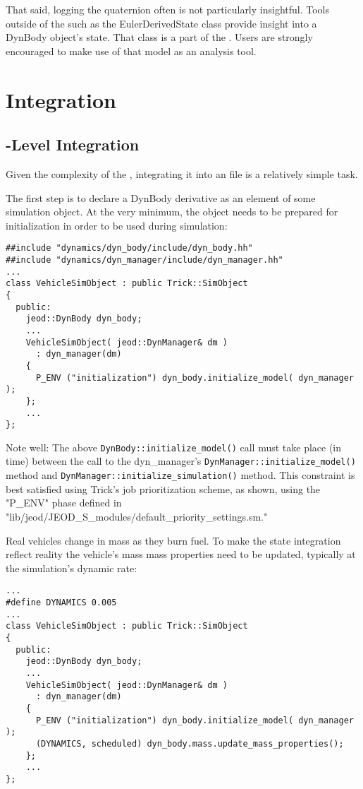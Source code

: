That said, logging the quaternion often is not particularly insightful.
Tools outside of the \ModelDesc such as the EulerDerivedState class provide
insight into a DynBody object's state. That class is a part of the
. Users are strongly encouraged to make use of that
model as an analysis tool.

\section{Integration}
\subsection{\Sdefine-Level Integration}
Given the complexity of the \ModelDesc, integrating it into an \Sdefine file
is a relatively simple task.

The first step is to declare a DynBody derivative as an element of some
simulation object. At the very minimum, the object needs to be prepared for 
initialization in order to be used during simulation:
\begin{verbatim}
##include "dynamics/dyn_body/include/dyn_body.hh"
##include "dynamics/dyn_manager/include/dyn_manager.hh"
...
class VehicleSimObject : public Trick::SimObject
{
  public:
    jeod::DynBody dyn_body;
    ...
    VehicleSimObject( jeod::DynManager& dm )
      : dyn_manager(dm)
    {
      P_ENV ("initialization") dyn_body.initialize_model( dyn_manager );
    };
    ...
};
\end{verbatim}
Note well: The above \verb+DynBody::initialize_model()+ call must take place 
(in time) between the call to the dyn\_manager's \verb+DynManager::initialize_model()+ 
method and \verb+DynManager::initialize_simulation()+ method.
This constraint is best satisfied using Trick's job prioritization scheme, as 
shown, using the "P\_ENV" phase defined in 
"lib/jeod/JEOD\_S\_modules/default\_priority\_settings.sm."

Real vehicles change in mass as they burn fuel. To make the state integration
reflect reality the vehicle's mass mass properties need to be updated,
typically at the simulation's dynamic rate:
\begin{verbatim}
...
#define DYNAMICS 0.005
...
class VehicleSimObject : public Trick::SimObject
{
  public:
    jeod::DynBody dyn_body;
    ...
    VehicleSimObject( jeod::DynManager& dm )
      : dyn_manager(dm)
    {
      P_ENV ("initialization") dyn_body.initialize_model( dyn_manager );
      (DYNAMICS, scheduled) dyn_body.mass.update_mass_properties();
    };
    ...
};
\end{verbatim}

